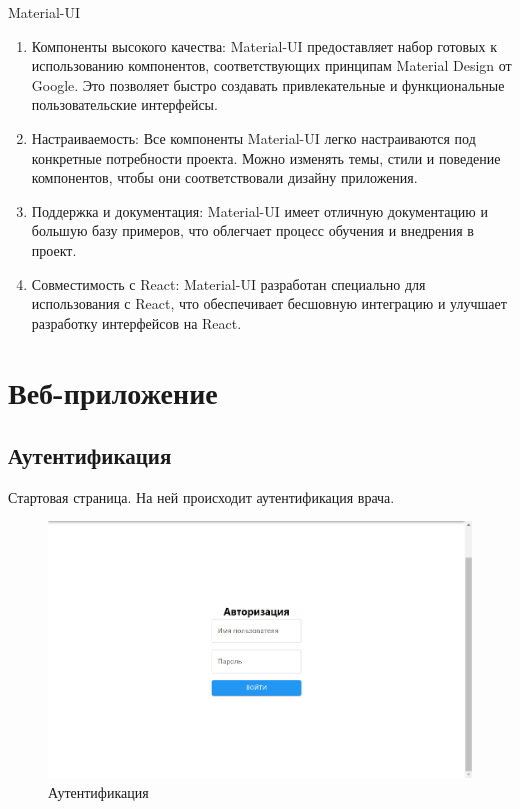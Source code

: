 \documentclass[a4paper,12pt]{article}
\begin{document}
		Material-UI
		\begin{enumerate}
			\item Компоненты высокого качества: Material-UI предоставляет набор готовых к использованию компонентов, соответствующих принципам Material Design от Google.
			Это позволяет быстро создавать привлекательные и функциональные пользовательские интерфейсы.

			\item Настраиваемость: Все компоненты Material-UI легко настраиваются под конкретные потребности проекта.
			Можно изменять темы, стили и поведение компонентов, чтобы они соответствовали дизайну приложения.

			\item Поддержка и документация: Material-UI имеет отличную документацию и большую базу примеров, что облегчает процесс обучения и внедрения в проект.

			\item Совместимость с React: Material-UI разработан специально для использования с React, что обеспечивает бесшовную интеграцию и улучшает разработку интерфейсов на React.

		\end{enumerate}

	\newpage
	\section{Веб-приложение}

		\subsection{Аутентификация}
			Стартовая страница.
			На ней происходит аутентификация врача.
			\begin{figure}[h]
				\includegraphics[scale=0.25]{images/screenshots/auth}
				\caption{Аутентификация}\label{fig:figure4}
			\end{figure}
\end{document}

